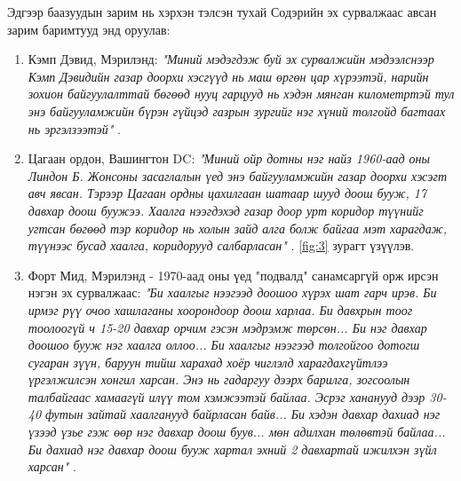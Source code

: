 \documentclass[10pt,twocolumn,letterpaper]{article}
\begin{document}
Эдгээр баазуудын зарим нь хэрхэн тэлсэн тухай Содэрийн эх сурвалжаас авсан зарим баримтууд энд оруулав:
\begin{flushleft}
\begin{enumerate}
    \item Кэмп Дэвид, Мэрилэнд: \textit{"Миний мэдэгдэж буй эх сурвалжийн мэдээлснээр Кэмп Дэвидийн газар доорхи хэсгүүд нь маш өргөн цар хүрээтэй, нарийн зохион байгуулалттай бөгөөд нууц гарцууд нь хэдэн мянган километртэй тул энэ байгууламжийн бүрэн гүйцэд газрын зургийг нэг хүний толгойд багтаах нь эргэлзээтэй"} \cite{22}.
    \item Цагаан ордон, Вашингтон DC: \textit{"Миний ойр дотны нэг найз 1960-аад оны Линдон Б. Жонсоны засаглалын үед энэ байгууламжийн газар доорхи хэсэгт авч явсан. Тэрээр Цагаан ордны цахилгаан шатаар шууд доош бууж, 17 давхар доош буужээ. Хаалга нээгдэхэд газар доор урт коридор түүнийг угтсан бөгөөд тэр коридор нь холын зайд алга болж байгаа мэт харагдаж, түүнээс бусад хаалга, коридорууд салбарласан"} \cite{22}. \ref{fig:3} зурагт үзүүлэв.
    \item Форт Мид, Мэрилэнд - 1970-аад оны үед "подвалд" санамсаргүй орж ирсэн нэгэн эх сурвалжаас: \textit{"Би хаалгыг нээгээд доошоо хүрэх шат гарч ирэв. Би ирмэг рүү очоо хашлаганы хоорондоор доош харлаа. Би давхрын тоог тоолоогүй ч 15-20 давхар орчим гэсэн мэдрэмж төрсөн... Би нэг давхар доошоо бууж нэг хаалга оллоо... Би хаалгыг нээгээд толгойгоо дотогш сугаран зүүн, баруун тийш харахад хоёр чиглэлд харагдахгүйтлээ үргэлжилсэн хонгил харсан. Энэ нь гадаргуу дээрх барилга, зогсоолын талбайгаас хамаагүй илүү том хэмжээтэй байлаа. Эсрэг хананууд дээр 30-40 футын зайтай хаалганууд байрласан байв... Би хэдэн давхар дахиад нэг үзээд үзье гэж өөр нэг давхар доош буув... мөн адилхан төлөвтэй байлаа... Би дахиад нэг давхар доош бууж хартал эхний 2 давхартай ижилхэн зүйл харсан"} \cite{22}.
\end{enumerate}
\end{flushleft}
\end{document}
